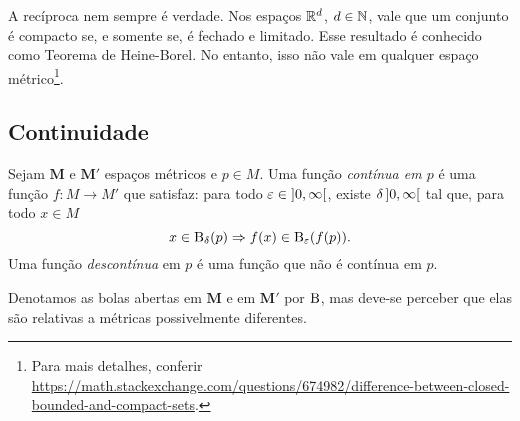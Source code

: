 A recíproca nem sempre é verdade. Nos espaços $\mathbb{R}^d$, $ d \in \mathbb{N}$, vale que um conjunto é compacto se, e somente se, é fechado e limitado. Esse resultado é conhecido como Teorema de Heine-Borel. No entanto, isso não vale em qualquer espaço métrico\footnote{Para mais detalhes, conferir \url{https://math.stackexchange.com/questions/674982/difference-between-closed-bounded-and-compact-sets}.}.

\subsection{Continuidade}

\begin{definition}
Sejam $\bm M$ e $\bm M'$ espaços métricos e $p \in M$. Uma função \emph{contínua em $p$} é uma função $f\colon M \to M'$ que satisfaz: para todo $\varepsilon \in \left]{0},{\infty}\right[$, existe $\delta \left]{0},{\infty}\right[$ tal que, para todo $x \in M$
	\begin{equation*}
	x \in \mathrm{B}_\delta(p) \Rightarrow f(x) \in \mathrm{B}_\varepsilon(f(p)).
	\end{equation*}
Uma função \emph{descontínua} em $p$ é uma função que não é contínua em $p$.
\end{definition}

Denotamos as bolas abertas em $\bm M$ e em $\bm M'$ por $\mathrm{B}$, mas deve-se perceber que elas são relativas a métricas possivelmente diferentes.

